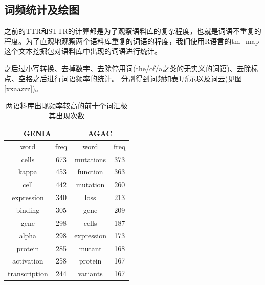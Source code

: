 \documentclass{article}
\begin{document}
\subsection{词频统计及绘图}
之前的TTR和STTR的计算都是为了观察语料库的复杂程度，也就是词语不重复的程度。为了直观地观察两个语料库重复的词语的程度，我们使用R语言的tm\_map这个文本挖掘包对语料库中出现的词语进行统计。

之后过小写转换、去掉数字、去除停用词(the/of/a之类的无实义的词语)、去除标点、空格之后进行词语频率的统计。
分别得到词频如表\ref{mmm}所示以及词云(见图 \ref{xxaazzz})。\\
\begin{table}[H]
\centering
\begin{tabular}{|c|c|c|c|}
\hline
\multicolumn{2}{|c|}{GENIA} & \multicolumn{2}{c|}{AGAC} \\ \hline
word              & freq    & word           & freq     \\ \hline
cells             & 673     & mutations      & 373      \\ \hline
kappa             & 453     & function       & 363      \\ \hline
cell              & 442     & mutation       & 260      \\ \hline
expression        & 340     & loss           & 213      \\ \hline
binding           & 305     & gene           & 209      \\ \hline
gene              & 298     & cells          & 187      \\ \hline
alpha             & 298     & expression     & 173      \\ \hline
protein           & 285     & mutant         & 168      \\ \hline
activation        & 258     & protein        & 167      \\ \hline
transcription     & 244     & variants       & 167      \\ \hline
\end{tabular}
\caption{两语料库出现频率较高的前十个词汇极其出现次数}
\label{mmm}
\end{table}
\end{document}
